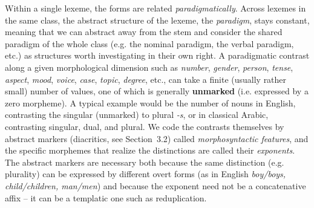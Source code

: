 Within a single lexeme, the forms are related {\it paradigmatically}. Across
lexemes in the same class, the abstract structure of the lexeme, the {\it
  paradigm}, stays constant, meaning that we can abstract away from the stem
and consider the shared paradigm of the whole class (e.g. the nominal
paradigm, the verbal paradigm, etc.) as structures worth investigating in
their own right.  A paradigmatic contrast along a given morphological
dimension such as {\it number}, {\it gender}, {\it person}, {\it tense}, {\it
  aspect}, {\it mood}, {\it voice}, {\it case}, {\it topic}, {\it degree},
etc., can take a finite (usually rather small) number of values, one of which
is generally {\bf unmarked} (i.e. expressed by a zero morpheme). A typical
example would be the number of nouns in English, contrasting the singular
(unmarked) to plural {\it -s}, or in classical Arabic, contrasting singular,
dual, and plural. We code the contrasts themselves by abstract markers
(diacritics, see Section~3.2) called {\it morphosyntactic features}, and the
specific morphemes that realize the distinctions are called their {\it
  exponents}. The abstract markers are necessary both because the same
distinction (e.g. plurality) can be expressed by different overt forms (as in
English {\it boy/boys, child/children, man/men}) and because the exponent need
not be a concatenative affix -- it can be a templatic one such as
reduplication.


